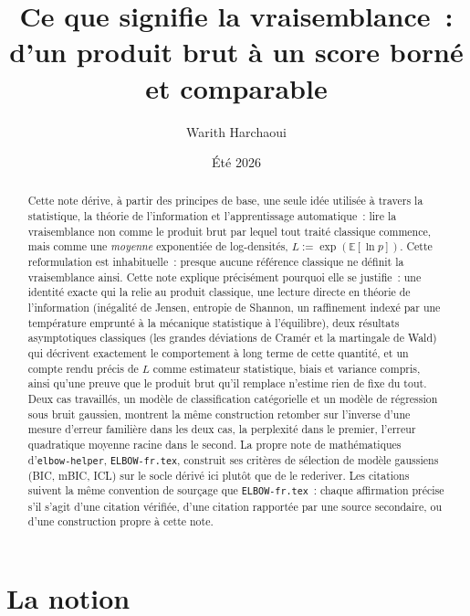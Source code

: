 \documentclass[11pt]{article}
\title{Ce que signifie la vraisemblance~: \\ d'un produit brut à un score borné et comparable}
\author{Warith Harchaoui}
\date{Été 2026}
\newcommand{\code}[1]{\texttt{#1}}
\begin{document}
\maketitle

\begin{abstract}
Cette note dérive, à partir des principes de base, une seule idée
utilisée à travers la statistique, la théorie de l'information et
l'apprentissage automatique~: lire la vraisemblance non comme le
produit brut par lequel tout traité classique commence, mais comme une
\emph{moyenne} exponentiée de log-densités, $L := \exp(\mathbb E[\ln
p])$. Cette reformulation est inhabituelle~: presque aucune référence
classique ne définit la vraisemblance ainsi. Cette note explique
précisément pourquoi elle se justifie~: une identité exacte qui la
relie au produit classique, une lecture directe en théorie de
l'information (inégalité de Jensen, entropie de Shannon, un
raffinement indexé par une température emprunté à la mécanique
statistique à l'équilibre), deux résultats asymptotiques classiques
(les grandes déviations de Cram\'er et la martingale de Wald) qui
décrivent exactement le comportement à long terme de cette quantité,
et un compte rendu précis de $L$ comme estimateur statistique, biais et
variance compris, ainsi qu'une preuve que le produit brut qu'il
remplace n'estime rien de fixe du tout. Deux cas travaillés, un modèle
de classification catégorielle et un modèle de régression sous bruit
gaussien, montrent la même construction retomber sur l'inverse d'une
mesure d'erreur familière dans les deux cas, la perplexité dans le
premier, l'erreur quadratique moyenne racine dans le second. La propre
note de mathématiques d'\code{elbow-helper}, \code{ELBOW-fr.tex},
construit ses critères de sélection de modèle gaussiens (BIC, mBIC,
ICL) sur le socle dérivé ici plutôt que de le rederiver. Les citations
suivent la même convention de sourçage que \code{ELBOW-fr.tex}~: chaque
affirmation précise s'il s'agit d'une citation vérifiée, d'une citation
rapportée par une source secondaire, ou d'une construction propre à
cette note.
\end{abstract}

\clearpage

\tableofcontents

\clearpage

\section{La notion}
\label{sec:notion}
\end{document}
